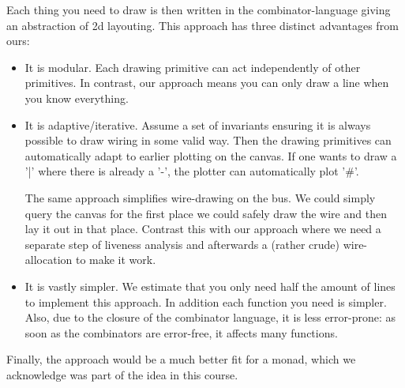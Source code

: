 Each thing you need to draw is then written in the combinator-language
giving an abstraction of 2d layouting. This approach has three distinct
advantages from ours:
\begin{itemize}
\item It is modular. Each drawing primitive can act independently of
  other primitives. In contrast, our approach means you can only draw
  a line when you know everything.
\item It is adaptive/iterative. Assume a set of invariants
  ensuring it is always possible to draw wiring in some valid
  way. Then the drawing primitives can automatically adapt to earlier
  plotting on the canvas. If one wants to draw a '|' where there is
  already a '-', the plotter can automatically plot '\#'.

  The same approach simplifies wire-drawing on the bus. We could
  simply query the canvas for the first place we could safely draw the
  wire and then lay it out in that place. Contrast this with our
  approach where we need a separate step of liveness analysis and
  afterwards a (rather crude) wire-allocation to make it work.
\item It is vastly simpler. We estimate that you only need half the
  amount of lines to implement this approach. In addition each
  function you need is simpler. Also, due to the closure of the
  combinator language, it is less error-prone: as soon as the
  combinators are error-free, it affects many functions.
\end{itemize}
Finally, the approach would be a much better fit for a monad, which we
acknowledge was part of the idea in this course.


